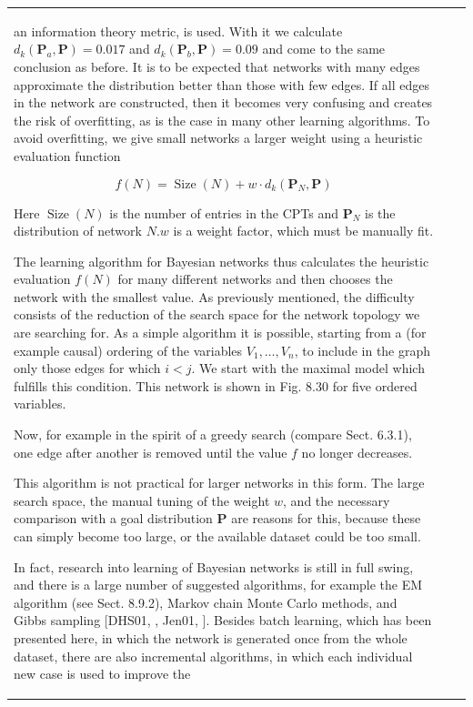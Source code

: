 \documentclass[10pt]{book}
\begin{document}
\begin{center}
\begin{tabular}{|l|l|l|}
an information theory metric, is used. With it we calculate $d_{k}\left(\boldsymbol{P}_{a}, \boldsymbol{P}\right)=0.017$ and $d_{k}\left(\boldsymbol{P}_{b}, \boldsymbol{P}\right)=0.09$ and come to the same conclusion as before. It is to be expected that networks with many edges approximate the distribution better than those with few edges. If all edges in the network are constructed, then it becomes very confusing and creates the risk of overfitting, as is the case in many other learning algorithms. To avoid overfitting, we give small networks a larger weight using a heuristic evaluation function

$$
f(N)=\operatorname{Size}(N)+w \cdot d_{k}\left(\boldsymbol{P}_{N}, \boldsymbol{P}\right)
$$

Here $\operatorname{Size}(N)$ is the number of entries in the CPTs and $\boldsymbol{P}_{N}$ is the distribution of network $N . w$ is a weight factor, which must be manually fit.

The learning algorithm for Bayesian networks thus calculates the heuristic evaluation $f(N)$ for many different networks and then chooses the network with the smallest value. As previously mentioned, the difficulty consists of the reduction of the search space for the network topology we are searching for. As a simple algorithm it is possible, starting from a (for example causal) ordering of the variables $V_{1}, \ldots, V_{n}$, to include in the graph only those edges for which $i<j$. We start with the maximal model which fulfills this condition. This network is shown in Fig. 8.30 for five ordered variables.

Now, for example in the spirit of a greedy search (compare Sect. 6.3.1), one edge after another is removed until the value $f$ no longer decreases.

This algorithm is not practical for larger networks in this form. The large search space, the manual tuning of the weight $w$, and the necessary comparison with a goal distribution $\boldsymbol{P}$ are reasons for this, because these can simply become too large, or the available dataset could be too small.

In fact, research into learning of Bayesian networks is still in full swing, and there is a large number of suggested algorithms, for example the EM algorithm (see Sect. 8.9.2), Markov chain Monte Carlo methods, and Gibbs sampling [DHS01, \cite{jor99}, Jen01, \cite{htf09}]. Besides batch learning, which has been presented here, in which the network is generated once from the whole dataset, there are also incremental algorithms, in which each individual new case is used to improve the


\end{tabular}
\end{center}
\end{document}
